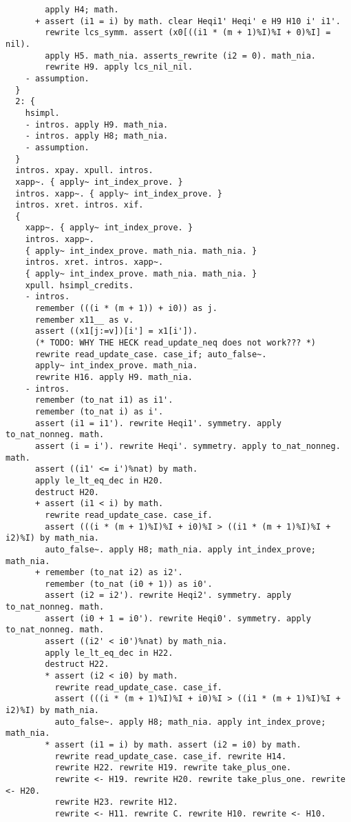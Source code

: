 \begin{verbatim}
        apply H4; math. 
      + assert (i1 = i) by math. clear Heqi1' Heqi' e H9 H10 i' i1'. 
        rewrite lcs_symm. assert (x0[((i1 * (m + 1)%I)%I + 0)%I] = nil). 
        apply H5. math_nia. asserts_rewrite (i2 = 0). math_nia. 
        rewrite H9. apply lcs_nil_nil. 
    - assumption. 
  }
  2: {
    hsimpl. 
    - intros. apply H9. math_nia. 
    - intros. apply H8; math_nia. 
    - assumption. 
  }
  intros. xpay. xpull. intros. 
  xapp~. { apply~ int_index_prove. }
  intros. xapp~. { apply~ int_index_prove. }
  intros. xret. intros. xif. 
  {
    xapp~. { apply~ int_index_prove. }
    intros. xapp~. 
    { apply~ int_index_prove. math_nia. math_nia. } 
    intros. xret. intros. xapp~. 
    { apply~ int_index_prove. math_nia. math_nia. } 
    xpull. hsimpl_credits. 
    - intros. 
      remember (((i * (m + 1)) + i0)) as j. 
      remember x11__ as v. 
      assert ((x1[j:=v])[i'] = x1[i']). 
      (* TODO: WHY THE HECK read_update_neq does not work??? *)
      rewrite read_update_case. case_if; auto_false~. 
      apply~ int_index_prove. math_nia. 
      rewrite H16. apply H9. math_nia. 
    - intros. 
      remember (to_nat i1) as i1'. 
      remember (to_nat i) as i'. 
      assert (i1 = i1'). rewrite Heqi1'. symmetry. apply to_nat_nonneg. math. 
      assert (i = i'). rewrite Heqi'. symmetry. apply to_nat_nonneg. math. 
      assert ((i1' <= i')%nat) by math. 
      apply le_lt_eq_dec in H20. 
      destruct H20. 
      + assert (i1 < i) by math. 
        rewrite read_update_case. case_if. 
        assert (((i * (m + 1)%I)%I + i0)%I > ((i1 * (m + 1)%I)%I + i2)%I) by math_nia. 
        auto_false~. apply H8; math_nia. apply int_index_prove; math_nia. 
      + remember (to_nat i2) as i2'. 
        remember (to_nat (i0 + 1)) as i0'. 
        assert (i2 = i2'). rewrite Heqi2'. symmetry. apply to_nat_nonneg. math. 
        assert (i0 + 1 = i0'). rewrite Heqi0'. symmetry. apply to_nat_nonneg. math. 
        assert ((i2' < i0')%nat) by math_nia. 
        apply le_lt_eq_dec in H22. 
        destruct H22. 
        * assert (i2 < i0) by math. 
          rewrite read_update_case. case_if. 
          assert (((i * (m + 1)%I)%I + i0)%I > ((i1 * (m + 1)%I)%I + i2)%I) by math_nia. 
          auto_false~. apply H8; math_nia. apply int_index_prove; math_nia. 
        * assert (i1 = i) by math. assert (i2 = i0) by math. 
          rewrite read_update_case. case_if. rewrite H14. 
          rewrite H22. rewrite H19. rewrite take_plus_one. 
          rewrite <- H19. rewrite H20. rewrite take_plus_one. rewrite <- H20. 
          rewrite H23. rewrite H12. 
          rewrite <- H11. rewrite C. rewrite H10. rewrite <- H10. 

\end{verbatim}
